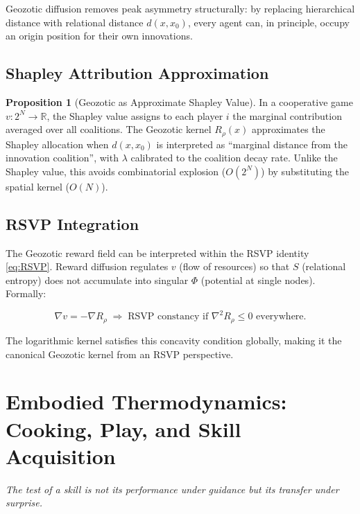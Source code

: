 \documentclass[12pt,a4paper]{article}
\theoremstyle{definition}
\newtheorem{proposition}{Proposition}[section]
\begin{document}
Geozotic diffusion removes peak asymmetry structurally: by replacing hierarchical
distance with relational distance $d(x, x_0)$, every agent can, in principle,
occupy an origin position for their own innovations.

\subsection{Shapley Attribution Approximation}

\begin{proposition}[Geozotic as Approximate Shapley Value]
  In a cooperative game $v : 2^N \to \mathbb{R}$, the Shapley value assigns
  to each player $i$ the marginal contribution averaged over all coalitions.
  The Geozotic kernel $R_\rho(x)$ approximates the Shapley allocation when
  $d(x, x_0)$ is interpreted as ``marginal distance from the innovation
  coalition'', with $\lambda$ calibrated to the coalition decay rate.
  Unlike the Shapley value, this avoids combinatorial explosion ($O(2^N)$)
  by substituting the spatial kernel ($O(N)$).
\end{proposition}

\subsection{RSVP Integration}

The Geozotic reward field can be interpreted within the RSVP identity
\eqref{eq:RSVP}.  Reward diffusion regulates $v$ (flow of resources) so
that $S$ (relational entropy) does not accumulate into singular $\Phi$
(potential at single nodes).  Formally:

\begin{equation}
  \nabla v = -\nabla R_\rho \;\Longrightarrow\; \text{RSVP constancy if }
  \nabla^2 R_\rho \leq 0 \text{ everywhere.}
\end{equation}

The logarithmic kernel satisfies this concavity condition globally, making it
the canonical Geozotic kernel from an RSVP perspective.

\section{Embodied Thermodynamics: Cooking, Play, and Skill Acquisition}
\label{sec:embodied}

\epigraph{\itshape The test of a skill is not its performance under guidance
  but its transfer under surprise.}{}
\end{document}
